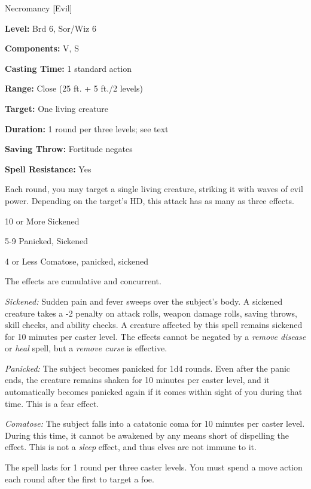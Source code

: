 
Necromancy [Evil]

\textbf{Level:} Brd 6, Sor/Wiz 6

\textbf{Components:} V, S

\textbf{Casting Time:} 1 standard action

\textbf{Range:} Close (25 ft. + 5 ft./2 levels)

\textbf{Target:} One living creature

\textbf{Duration:} 1 round per three levels; see text

\textbf{Saving Throw:} Fortitude negates

\textbf{Spell Resistance:} Yes

Each round, you may target a single living creature, striking it with waves of 
evil power. Depending on the target's HD, this attack has as many as three effects.

\begin{description*}
\item[10 or More] Sickened
\item[5-9] Panicked, Sickened
\item[4 or Less] Comatose, panicked, sickened
\end{description*}

The effects are cumulative and concurrent.

\textit{Sickened:} Sudden pain and fever sweeps over the subject's body. A sickened 
creature takes a -2 penalty on attack rolls, weapon damage rolls, saving throws, 
skill checks, and ability checks. A creature affected by this spell remains sickened 
for 10 minutes per caster level. The effects cannot be negated by a \textit{remove 
disease} or \textit{heal} spell, but a \textit{remove curse} is effective.

\textit{Panicked:} The subject becomes panicked for 1d4 rounds. Even after the 
panic ends, the creature remains shaken for 10 minutes per caster level, and it 
automatically becomes panicked again if it comes within sight of you during that 
time. This is a fear effect.

\textit{Comatose:} The subject falls into a catatonic coma for 10 minutes per caster 
level. During this time, it cannot be awakened by any means short of dispelling 
the effect. This is not a \textit{sleep} effect, and thus elves are not immune 
to it.

The spell lasts for 1 round per three caster levels. You must spend a move action 
each round after the first to target a foe.





